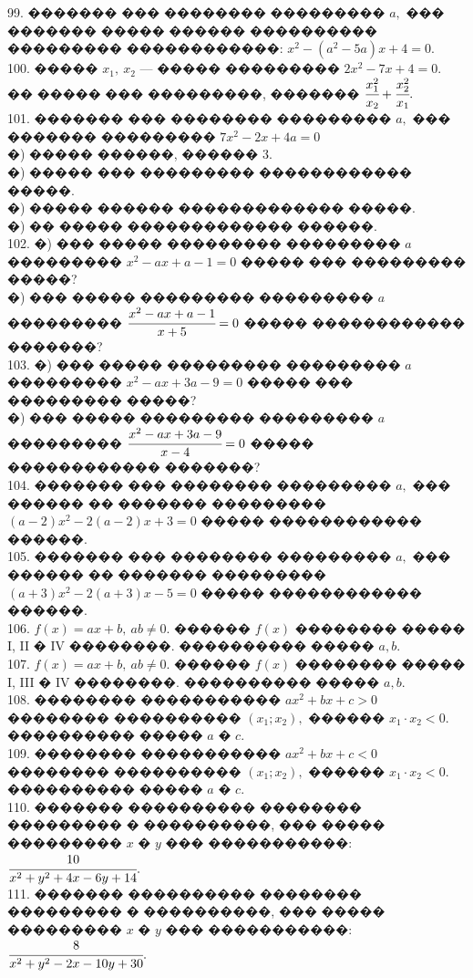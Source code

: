 \documentclass[12pt]{article}
\begin{document}
99. ������� ��� �������� ��������� $a,$ ��� ������� ����� ������ ���������� ��������� ������������: $x^2-(a^2-5a)x+4=0.$\\
100. ����� $x_1,\ x_2$ --- ����� ��������� $2x^2-7x+4=0.$ �� ����� ��� ���������, ������� $\cfrac{x_1^2}{x_2}+\cfrac{x_2^2}{x_1}.$\\
101. ������� ��� �������� ��������� $a,$ ��� ������� ��������� $7x^2-2x+4a=0$\\
�) ����� ������, ������ 3.\\
�) ����� ��� ��������� ������������ �����.\\
�) ����� ������ ������������� �����.\\
�) �� ����� ������������� ������.\\
102. �) ��� ����� ��������� ��������� $a$ ��������� $x^2-ax+a-1=0$ ����� ��� ��������� �����?\\
�) ��� ����� ��������� ��������� $a$ ��������� $\cfrac{x^2-ax+a-1}{x+5}=0$ ����� ������������ �������?\\
103. �) ��� ����� ��������� ��������� $a$ ��������� $x^2-ax+3a-9=0$ ����� ��� ��������� �����?\\
�) ��� ����� ��������� ��������� $a$ ��������� $\cfrac{x^2-ax+3a-9}{x-4}=0$ ����� ������������ �������?\\
104. ������� ��� �������� ��������� $a,$ ��� ������ �� ������� ���������
$(a - 2)x^2 - 2(a - 2)x + 3 = 0$ ����� ������������ ������.\\
105. ������� ��� �������� ��������� $a,$ ��� ������ �� ������� ���������
$(a + 3)x^2 - 2(a + 3)x - 5 = 0$ ����� ������������ ������.\\
106. $f(x)=ax+b,\ ab\neq 0.$ ������ $f(x)$ �������� ����� I, II � IV ��������. ���������� ����� $a,b.$\\
107. $f(x)=ax+b,\ ab\neq 0.$ ������ $f(x)$ �������� ����� I, III � IV ��������. ���������� ����� $a,b.$\\
108. �������� ����������� $ax^2 + bx + c > 0$ �������� ���������� $(x_1; x_2),$ ������ $x_1\cdot x_2 <  0.$ ���������� ����� $a$ � $c.$\\
109. �������� ����������� $ax^2 + bx + c < 0$ �������� ���������� $(x_1; x_2),$ ������ $x_1\cdot x_2 <  0.$ ���������� ����� $a$ � $c.$\\
110. ������� ���������� �������� ��������� � ����������, ��� ����� ��������� $x$ � $y$ ��� �����������: $\cfrac{10}{x^2+y^2+4x-6y+14}.$\\
111. ������� ���������� �������� ��������� � ����������, ��� ����� ��������� $x$ � $y$ ��� �����������: $\cfrac{8}{x^2+y^2-2x-10y+30}.$\\
\end{document}
